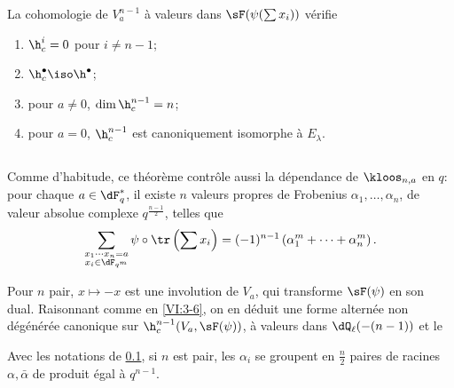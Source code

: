 \begin{theorem_}\label{VI:7-4}
La cohomologie de $V_a^{n-1}$ à valeurs dans $\sF(\psi(\sum x_i))$ vérifie 
\begin{enumerate}[\indent (i)]
  \item $\h_c^i=0$ pour $i\ne n-1$; 
  \item $\h_c^\bullet{} \iso \h^\bullet{}$; 
  \item pour $a\ne 0$, $\dim \h_c^{n-1}{}=n$; 
\item pour $a=0$, $\h_c^{n-1}{}$ est canoniquement isomorphe à $E_\lambda$. 
\end{enumerate}
\end{theorem_}





\subsection{}\label{VI:7-5}

Comme d'habitude, ce théorème contrôle aussi la dépendance de 
$\kloos_{n,a}$ en $q$: pour chaque $a\in \dF_q^\ast$, il existe $n$ valeurs 
propres de Frobenius $\alpha_1,\dots,\alpha_n$, de valeur absolue complexe 
$q^{\frac{n-1}{2}}$, telles que 
\[
  \sum_{\substack{x_1\dotsm x_n = a \\ x_i\in \dF_{q^m}}} \psi\circ \tr\left(\sum x_i\right) = (-1)^{n-1} \left(\alpha_1^m + \cdots + \alpha_n^m \right) \text{.} 
\]

Pour $n$ pair, $x\mapsto -x$ est une involution de $V_a$, qui transforme 
$\sF(\psi)$ en son dual. Raisonnant comme en \ref{VI:3-6}, on en déduit une 
forme alternée non dégénérée canonique sur $\h_c^{n-1}(V_a,\sF(\psi))$, 
à valeurs dans $\dQ_\ell(-(n-1))$ et le 





\begin{corollary_}\label{VI:7-6}
Avec les notations de \ref{VI:7-5}, si $n$ est pair, les $\alpha_i$ se groupent 
en $\frac n 2$ paires de racines $\alpha,\bar\alpha$ de produit égal à 
$q^{n-1}$. 
\end{corollary_}





\subsection{}\label{VI:7-7}

